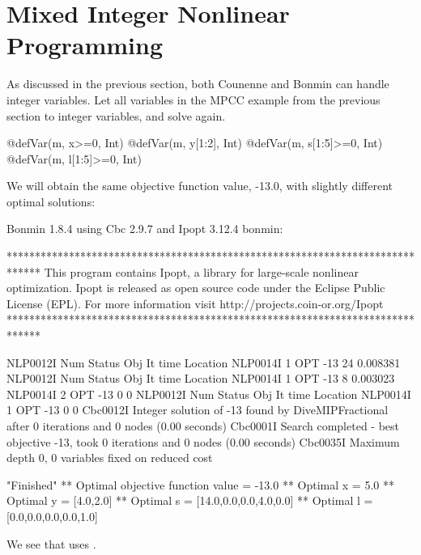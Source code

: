 \section{Mixed Integer Nonlinear Programming}

As discussed in the previous section, both Counenne and Bonmin can handle integer variables. Let all variables in the MPCC example from the previous section to integer variables, and solve again.
\begin{code}
@defVar(m, x>=0, Int)
@defVar(m, y[1:2], Int)
@defVar(m, s[1:5]>=0, Int)
@defVar(m, l[1:5]>=0, Int)
\end{code}
\noindent We will obtain the same objective function value, -13.0, with slightly different optimal solutions:
{\tiny
\begin{code}
Bonmin 1.8.4 using Cbc 2.9.7 and Ipopt 3.12.4
bonmin:

******************************************************************************
This program contains Ipopt, a library for large-scale nonlinear optimization.
 Ipopt is released as open source code under the Eclipse Public License (EPL).
         For more information visit http://projects.coin-or.org/Ipopt
******************************************************************************

NLP0012I
              Num      Status      Obj             It       time                 Location
NLP0014I             1         OPT -13       24 0.008381
NLP0012I
              Num      Status      Obj             It       time                 Location
NLP0014I             1         OPT -13        8 0.003023
NLP0014I             2         OPT -13        0 0
NLP0012I
              Num      Status      Obj             It       time                 Location
NLP0014I             1         OPT -13        0 0
Cbc0012I Integer solution of -13 found by DiveMIPFractional after 0 iterations and 0 nodes (0.00 seconds)
Cbc0001I Search completed - best objective -13, took 0 iterations and 0 nodes (0.00 seconds)
Cbc0035I Maximum depth 0, 0 variables fixed on reduced cost

 	"Finished"
** Optimal objective function value = -13.0
** Optimal x = 5.0
** Optimal y = [4.0,2.0]
** Optimal s = [14.0,0.0,0.0,4.0,0.0]
** Optimal l = [0.0,0.0,0.0,0.0,1.0]
\end{code}
}
\noindent We see that  uses .
